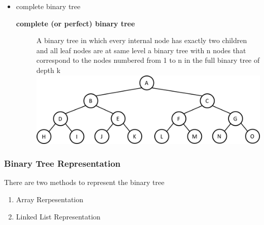\documentclass[newPxFont,sthlmFooter,nooffset]{beamer}
\begin{document}
\begin{frame}[t, allowframebreaks]
\begin{itemize}
\begin{description}
\newpage
~\bigskip
    \end{description}
  \item complete binary tree 
    \begin{description}
    \item[\textbf{complete (or perfect) binary tree}] A binary tree in which every internal node has exactly two children and all leaf nodes are at same level
a binary tree with n nodes that
      correspond to the nodes numbered from 1 to n in the full binary
      tree of depth k\\
        \includegraphics[height=0.3\textheight]{figures/fig06_complete.png}


    \end{description}

  \end{itemize}

\end{frame}


\begin{frame}[t]
  \frametitle{Binary Tree Representation}
There are two methods to represent the binary tree
\begin{enumerate}
\item Array Rerpesentation
\item Linked List Representation
\end{enumerate}
\end{frame}
\end{document}
